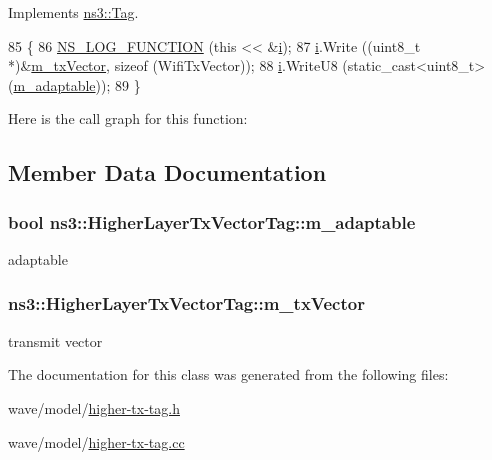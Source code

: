 Implements \hyperlink{classns3_1_1Tag_ac9aa7c4f923da5d2c82de94690101dc3}{ns3\+::\+Tag}.


\begin{DoxyCode}
85 \{
86   \hyperlink{log-macros-disabled_8h_a90b90d5bad1f39cb1b64923ea94c0761}{NS\_LOG\_FUNCTION} (\textcolor{keyword}{this} << &\hyperlink{bernuolliDistribution_8m_a6f6ccfcf58b31cb6412107d9d5281426}{i});
87   \hyperlink{bernuolliDistribution_8m_a6f6ccfcf58b31cb6412107d9d5281426}{i}.Write ((uint8\_t *)&\hyperlink{classns3_1_1HigherLayerTxVectorTag_a568e75c39a2d8ccd08d87079cce273c9}{m\_txVector}, \textcolor{keyword}{sizeof} (WifiTxVector));
88   \hyperlink{bernuolliDistribution_8m_a6f6ccfcf58b31cb6412107d9d5281426}{i}.WriteU8 (static\_cast<uint8\_t> (\hyperlink{classns3_1_1HigherLayerTxVectorTag_a4e86e370dc295a18951f1533bed551e6}{m\_adaptable}));
89 \}
\end{DoxyCode}


Here is the call graph for this function\+:




\subsection{Member Data Documentation}
\subsubsection[{\texorpdfstring{m\+\_\+adaptable}{m_adaptable}}]{\setlength{\rightskip}{0pt plus 5cm}bool ns3\+::\+Higher\+Layer\+Tx\+Vector\+Tag\+::m\+\_\+adaptable\hspace{0.3cm}{\ttfamily [private]}}\hypertarget{classns3_1_1HigherLayerTxVectorTag_a4e86e370dc295a18951f1533bed551e6}{}\label{classns3_1_1HigherLayerTxVectorTag_a4e86e370dc295a18951f1533bed551e6}


adaptable 

\subsubsection[{\texorpdfstring{m\+\_\+tx\+Vector}{m_txVector}}]{ ns3\+::\+Higher\+Layer\+Tx\+Vector\+Tag\+::m\+\_\+tx\+Vector\hspace{0.3cm}{\ttfamily [private]}}\hypertarget{classns3_1_1HigherLayerTxVectorTag_a568e75c39a2d8ccd08d87079cce273c9}{}\label{classns3_1_1HigherLayerTxVectorTag_a568e75c39a2d8ccd08d87079cce273c9}


transmit vector 



The documentation for this class was generated from the following files\+:\begin{DoxyCompactItemize}
\item 
wave/model/\hyperlink{higher-tx-tag_8h}{higher-\/tx-\/tag.\+h}\item 
wave/model/\hyperlink{higher-tx-tag_8cc}{higher-\/tx-\/tag.\+cc}\end{DoxyCompactItemize}
